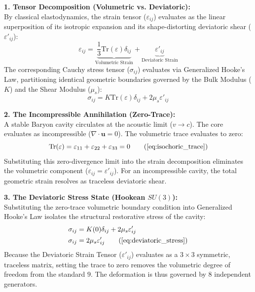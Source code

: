 \textbf{1. Tensor Decomposition (Volumetric vs. Deviatoric):} \\
By classical elastodynamics, the strain tensor ($\varepsilon_{ij}$) evaluates as the linear superposition of its isotropic expansion and its shape-distorting deviatoric shear ($\varepsilon'_{ij}$):
\begin{equation}
    \varepsilon_{ij} = \underbrace{\frac{1}{3}\text{Tr}(\varepsilon)\delta_{ij}}_{\text{Volumetric Strain}} + \underbrace{\varepsilon'_{ij}}_{\text{Deviatoric Strain}} 
\end{equation}
The corresponding Cauchy stress tensor ($\sigma_{ij}$) evaluates via Generalized Hooke's Law, partitioning identical geometric boundaries governed by the Bulk Modulus ($K$) and the Shear Modulus ($\mu_s$):
\begin{equation}
    \sigma_{ij} = K \text{Tr}(\varepsilon)\delta_{ij} + 2\mu_s \varepsilon'_{ij} 
\end{equation}

\textbf{2. The Incompressible Annihilation (Zero-Trace):} \\
A stable Baryon cavity circulates at the acoustic limit ($v \to c$). The core evaluates as incompressible ($\nabla \cdot \mathbf{u} = 0$). The volumetric trace evaluates to zero:
\begin{equation}
    \text{Tr}(\varepsilon) = \varepsilon_{11} + \varepsilon_{22} + \varepsilon_{33} = 0 \tag{\ref{eq:isochoric_trace}}
\end{equation}
Substituting this zero-divergence limit into the strain decomposition eliminates the volumetric component ($\varepsilon_{ij} = \varepsilon'_{ij}$). For an incompressible cavity, the total geometric strain resolves as traceless deviatoric shear.

\textbf{3. The Deviatoric Stress State (Hookean $SU(3)$):} \\
Substituting the zero-trace volumetric boundary condition into Generalized Hooke's Law isolates the structural restorative stress of the cavity:
\begin{align}
    \sigma_{ij} &= K(0)\delta_{ij} + 2\mu_s \varepsilon'_{ij}  \\
    \sigma_{ij} &= 2\mu_s \varepsilon'_{ij} \tag{\ref{eq:deviatoric_stress}}
\end{align}
Because the Deviatoric Strain Tensor ($\varepsilon'_{ij}$) evaluates as a $3 \times 3$ symmetric, traceless matrix, setting the trace to zero removes the volumetric degree of freedom from the standard $9$. The deformation is thus governed by $8$ independent generators.

